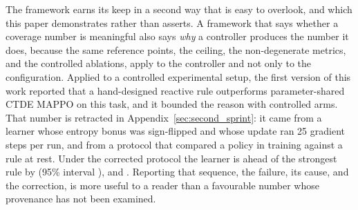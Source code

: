\documentclass[conference]{IEEEtran}
\begin{document}
The framework earns its keep in a second way that is easy to overlook, and which this paper demonstrates rather than asserts.  A framework that says whether a coverage number is meaningful also says \emph{why} a controller produces the number it does, because the same reference points, the ceiling, the non-degenerate metrics, and the controlled ablations, apply to the controller and not only to the configuration.  Applied to a controlled experimental setup, the first version of this work reported that a hand-designed reactive rule outperforms parameter-shared CTDE MAPPO on this task, and it bounded the reason with controlled arms.  That number is retracted in Appendix~\ref{sec:second_sprint}: it came from a learner whose entropy bonus was sign-flipped and whose update ran 25 gradient steps per run, and from a protocol that compared a policy in training against a rule at rest.  Under the corrected protocol the learner is ahead of the strongest rule by \tokLearnerMinusRule{} (95\% interval \tokLearnerMinusRuleCi), and \tokGapVerdict.  Reporting that sequence, the failure, its cause, and the correction, is more useful to a reader than a favourable number whose provenance has not been examined.
\end{document}
